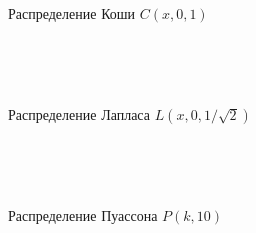 \documentclass[12pt]{article}
\begin{document}
\begin{figure}[h!]
	\begin{center}
	\begin{minipage}[h]{0.55\linewidth}
	\end{minipage}
	\phantom{0}\\
	\begin{minipage}[h]{0.55\linewidth}
	\end{minipage}
	\phantom{0}\\
	\begin{minipage}[h]{0.55\linewidth}
	\end{minipage}
	\caption{Распределение Коши $C(x, 0, 1)$}
\end{center}
\end{figure}
\newpage

\begin{figure}[h!]
	\begin{center}
	\begin{minipage}[h]{0.55\linewidth}
	\end{minipage}
	\phantom{0}\\
	\begin{minipage}[h]{0.55\linewidth}
	\end{minipage}
	\phantom{0}\\
	\begin{minipage}[h]{0.55\linewidth}
	\end{minipage}
	\caption{Распределение Лапласа $L(x, 0, 1/\sqrt{2})$}
\end{center}
\end{figure}
\newpage

\begin{figure}[h!]
	\begin{center}
	\begin{minipage}[h]{0.55\linewidth}
	\end{minipage}
	\phantom{0}\\
	\begin{minipage}[h]{0.55\linewidth}
	\end{minipage}
	\phantom{0}\\
	\begin{minipage}[h]{0.55\linewidth}
	\end{minipage}
	\caption{Распределение Пуассона $P(k, 10)$}
\end{center}
\end{figure}
\newpage
\end{document}
